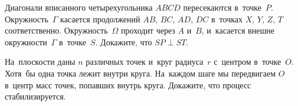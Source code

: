 \begin{problems}
\item
Диагонали вписанного четырехугольника $ABCD$ пересекаются в~точке~$P$.
Окружность~$\Gamma$ касается продолжений $AB$, $BC$, $AD$, $DC$
в~точках $X$, $Y$, $Z$, $T$ соответственно.
Окружность~$\Omega$ проходит через $A$ и~$B$, и~касается внешне
окружности~$\Gamma$ в~точке~$S$.
Докажите, что $SP \perp ST$.

\item
На~плоскости даны $n$ различных точек и~круг радиуса~$r$ с~центром в~точке~$O$.
Хотя~бы одна точка лежит внутри круга.
На~каждом шаге мы передвигаем $O$ в~центр масс точек, попавших внутрь круга.
Докажите, что процесс стабилизируется.

\end{problems}

